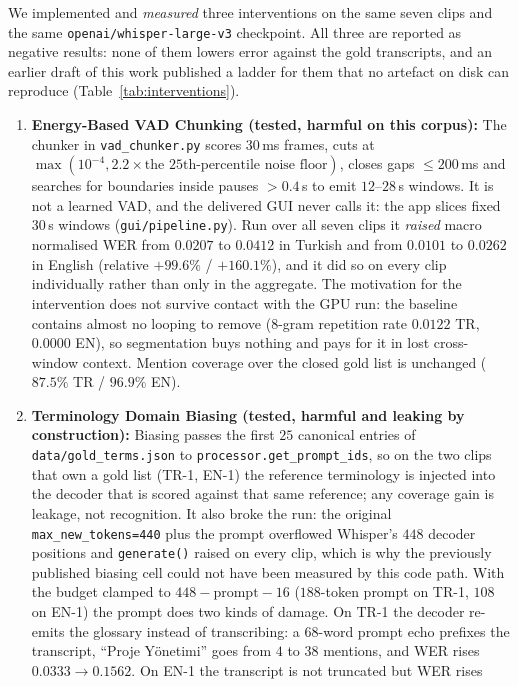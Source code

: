 \documentclass[conference]{IEEEtran}
\begin{document}
We implemented and \emph{measured} three interventions on the same seven clips and the same
\texttt{openai/whisper-large-v3} checkpoint. All three are reported as negative results: none of
them lowers error against the gold transcripts, and an earlier draft of this work published a
ladder for them that no artefact on disk can reproduce (Table~\ref{tab:interventions}).
\begin{enumerate}
\item \textbf{Energy-Based VAD Chunking (tested, harmful on this corpus):} The chunker in
\texttt{vad\_chunker.py} scores $30$\,ms frames, cuts at
$\max(10^{-4}, 2.2\times\text{the }25\text{th-percentile noise floor})$, closes gaps
$\le200$\,ms and searches for boundaries inside pauses $>0.4$\,s to emit $12$--$28$\,s windows.
It is not a learned VAD, and the delivered GUI never calls it: the app slices fixed $30$\,s
windows (\texttt{gui/pipeline.py}). Run over all seven clips it \emph{raised} macro normalised
WER from $0.0207$ to $0.0412$ in Turkish and from $0.0101$ to $0.0262$ in English (relative
$+99.6\%$ / $+160.1\%$), and it did so on every clip individually rather than only in the
aggregate. The motivation for the intervention does not survive contact with the GPU run: the
baseline contains almost no looping to remove ($8$-gram repetition rate $0.0122$ TR, $0.0000$ EN),
so segmentation buys nothing and pays for it in lost cross-window context. Mention coverage over
the closed gold list is unchanged ($87.5\%$ TR / $96.9\%$ EN).
\item \textbf{Terminology Domain Biasing (tested, harmful and leaking by construction):} Biasing
passes the first $25$ canonical entries of \texttt{data/gold\_terms.json} to
\texttt{processor.get\_prompt\_ids}, so on the two clips that own a gold list (TR-1, EN-1) the
reference terminology is injected into the decoder that is scored against that same reference;
any coverage gain is leakage, not recognition. It also broke the run: the original
\texttt{max\_new\_tokens=440} plus the prompt overflowed Whisper's $448$ decoder positions and
\texttt{generate()} raised on every clip, which is why the previously published biasing cell
could not have been measured by this code path. With the budget clamped to
$448-\text{prompt}-16$ ($188$-token prompt on TR-1, $108$ on EN-1) the prompt does two kinds of
damage. On TR-1 the decoder re-emits the glossary instead of transcribing: a $68$-word prompt
echo prefixes the transcript, ``Proje Yönetimi'' goes from $4$ to $38$ mentions, and WER rises
$0.0333 \rightarrow 0.1562$. On EN-1 the transcript is not truncated but WER rises

\end{enumerate}
\end{document}

